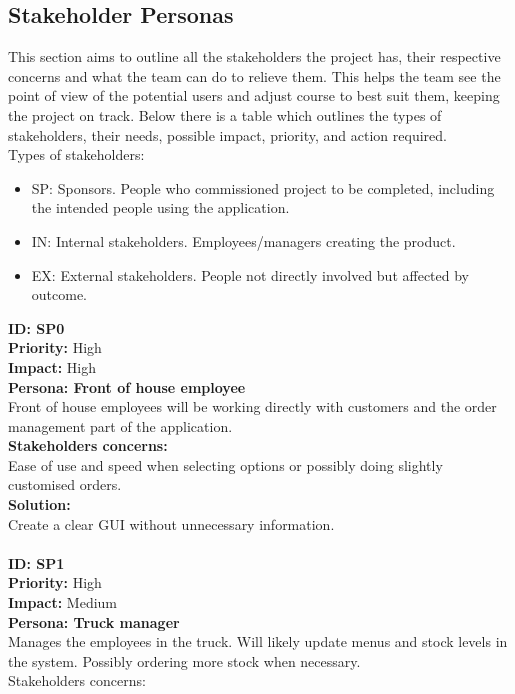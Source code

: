 
\subsection{Stakeholder Personas}
This section aims to outline all the stakeholders the project has, their respective concerns and what the team can do to relieve them. This helps the team see the point of view of the potential users and adjust course to best suit them, keeping the project on track. Below there is a table which outlines the types of stakeholders, their needs, possible impact, priority, and action required. \\
Types of stakeholders: \\
\begin{itemize}
	\item SP: Sponsors. People who commissioned project to be completed, including the intended people using the application. 
	\item IN: Internal stakeholders. Employees/managers creating the product. 
	\item EX: External stakeholders. People not directly involved but affected by outcome.\\
\end{itemize}
\textbf{ID: SP0\\}
\textbf{Priority:} High\\
\textbf{Impact:} High\\
\textbf{Persona: Front of house employee\\}
Front of house employees will be working directly with customers and the order management part of the application.\\
\textbf{Stakeholders concerns: \\}
Ease of use and speed when selecting options or possibly doing slightly customised orders.\\
\textbf{Solution:\\}
Create a clear GUI without unnecessary information.\\
\\
\textbf{ID: SP1\\}
\textbf{Priority:} High\\
\textbf{Impact:} Medium\\
\textbf{Persona: Truck manager\\}
Manages the employees in the truck. Will likely update menus and stock levels in the system. Possibly ordering more stock when necessary.\\
Stakeholders concerns:\\
